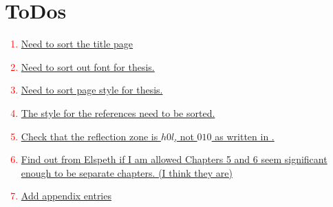\chapter{ToDos}
\textcolor{red}{
    \begin{enumerate}
        \item \hyperlink{todo:SortTitlePage}{Need to sort the title page}
        \item \hyperlink{todo:SortTextFont}{Need to sort out font for thesis.}
        \item \hyperlink{todo:SortPageStyle}{Need to sort page style for thesis.}
        \item \hyperlink{todo:SortReferenceStyle}{The style for the references need to be sorted.}
        \item \hyperlink{todo:checkrefzone}{Check that the reflection zone is $h0l$, not $010$ as written in \cite{south2007}.}
        \item \hyperlink{todo:ExtraChapter}{Find out from Elspeth if I am allowed Chapters 5 and 6 seem significant enough to be separate chapters. (I think they are)}
        \item \hyperlink{todo:Add appendix entries}{Add appendix entries}
    \end{enumerate}
}
